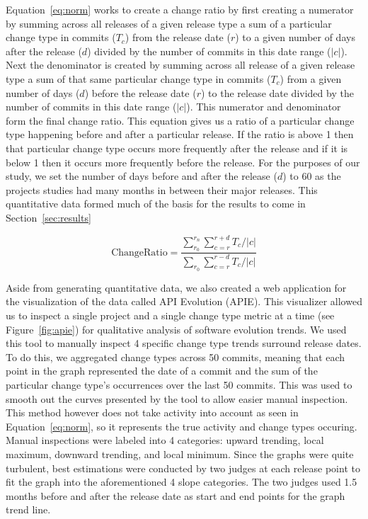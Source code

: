 \documentclass[conference]{IEEEtran}
\begin{document}
Equation~\ref{eq:norm} works to create a change ratio by first creating a numerator by summing across all releases of
a given release type a sum of a particular change type in commits ($T_c$)
from the release date ($r$) to a given number of days after the release ($d$) divided by the number of commits in this date range ($|c|$). Next the denominator
is created by summing across all release of a given release type
a sum of that same particular change type in commits ($T_c$) from a given number of days ($d$) before the release date ($r$) to
the release date divided by the number of commits in this date range ($|c|$). This numerator and denominator form the final change ratio.
This equation gives us a ratio of a particular change type happening before and after a particular release. If the ratio is above 1 then that particular change
type occurs more frequently after the release and if it is below 1 then it occurs more frequently before the release. For the purposes of our study, we set the
number of days before and after the release ($d$) to 60 as the projects studies had many months in between their major releases. This quantitative data
formed much of the basis for the results to come in Section~\ref{sec:results}

\begin{equation}
\text{ChangeRatio} = \frac{ \sum_{r_0}^{r_n}\sum_{c=r}^{r+d} T_c / |c|} { \sum_{r_0}\sum_{c=r}^{r-d} T_c / |c|}
\label{eq:norm}
\end{equation}

Aside from generating quantitative data, we also created a web application for the visualization of the data called API Evolution (APIE). This visualizer allowed
us to inspect a single project and a single change type metric at a time (see Figure~\ref{fig:apie}) for qualitative analysis of software evolution trends. We
used this tool to manually inspect 4 specific change type trends surround release dates. To do this, we aggregated change types across 50 commits, meaning that
each point in the graph represented the date of a commit and the sum of the particular change type's occurrences over the last 50 commits. This was used to smooth
out the curves presented by the tool to allow easier manual inspection. This method however does not take activity into account as seen in
Equation~\ref{eq:norm}, so it represents the true activity and change types occuring. Manual inspections were labeled into 4 categories: upward trending, local maximum, downward
trending, and local minimum. Since the graphs were quite turbulent, best estimations were conducted by two judges at each release point to fit the graph into the aforementioned
4 slope categories. The two judges used 1.5 months before and after the release date as start and end points for the graph trend line.
\end{document}
